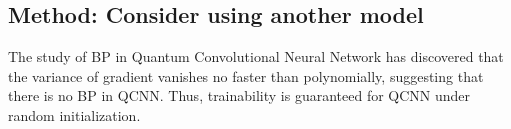 \subsection{Method: Consider using another model}


The study of BP in Quantum Convolutional Neural Network \cite{pesahAbsenceBarrenPlateaus2021} has discovered that the variance of gradient vanishes no faster than polynomially, suggesting that there is no BP in QCNN. Thus, trainability is guaranteed for QCNN under random initialization.
